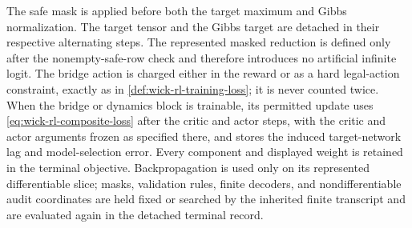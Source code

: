 \documentclass[11pt]{article}
\numberwithin{section}{part}
\theoremstyle{plain}
\theoremstyle{definition}
\theoremstyle{remark}
\begin{document}
The safe mask is applied before both the target maximum and Gibbs
normalization.  The target tensor and the Gibbs target are detached in their
respective alternating steps.  The represented masked reduction is defined
only after the nonempty-safe-row check and therefore introduces no artificial
infinite logit.  The bridge action is charged either in the
reward or as a hard legal-action constraint, exactly as in
\cref{def:wick-rl-training-loss}; it is never counted twice.  When the bridge
or dynamics block is trainable, its permitted update uses
\eqref{eq:wick-rl-composite-loss} after the critic and actor steps, with the
critic and actor arguments frozen as specified there, and stores the induced
target-network lag and model-selection error.  Every component and displayed
weight is retained in the terminal objective.  Backpropagation is used only
on its represented differentiable slice; masks, validation rules, finite
decoders, and nondifferentiable audit coordinates are held fixed or searched
by the inherited finite transcript and are evaluated again in the detached
terminal record.
\end{document}
